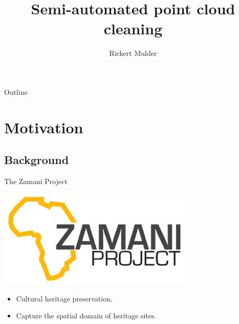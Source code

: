 \documentclass{beamer}
\title{Semi-automated point cloud cleaning}
\author{Rickert Mulder}
\institute[U of X]
{
  Department of Computer Science\\
  University of Cape Town
}
\begin{document}
\begin{frame}
  \titlepage
\end{frame}

\begin{frame}{Outline}
  \tableofcontents
\end{frame}





\section{Motivation}

\subsection{Background}

\begin{frame}{The Zamani Project}

  \includegraphics[width=0.70\textwidth]{pics/Zamani_logo}

  \begin{itemize}
  \item
    Cultural heritage preservation.
  \item
    Capture the spatial domain of heritage sites.
  \end{itemize}
\end{frame}
\end{document}
